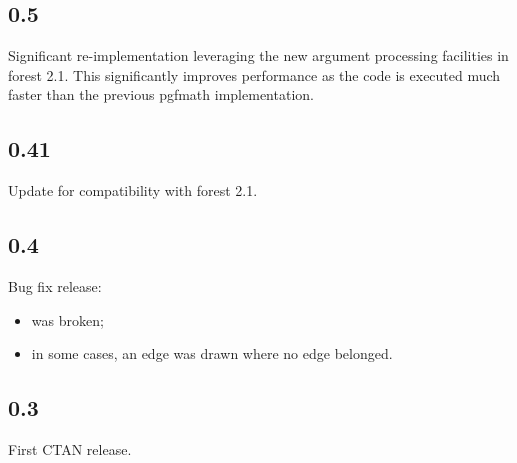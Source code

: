 \documentclass[10pt,british,a4paper,doc2]{ltxdoc}
\newcommand*\pkg[1]{\textsf{#1}}
\begin{document}

\subsection{0.5}\label{subsec:v0.5}

Significant re-implementation leveraging the new argument processing facilities in \pkg{forest} 2.1.
This significantly improves performance as the code is executed much faster than the previous \pkg{pgfmath} implementation.


\subsection{0.41}\label{subsec:v0.41}

Update for compatibility with \pkg{forest} 2.1.


\subsection{0.4}\label{subsec:v0.4}

Bug fix release:
\begin{itemize}
  \item {} was broken;
  \item in some cases, an edge was drawn where no edge belonged.
\end{itemize}


\subsection{0.3}\label{subsec:v0.3}

First CTAN release.



\printbibliography
\clearpage

%
\fancyheadoffset[lh]{0pt}%
\printindex
\end{document}
